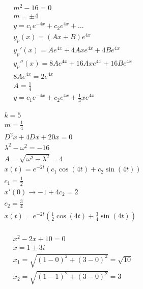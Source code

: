\documentclass[12pt]{article}
\begin{document}
\hline
\begin{equation}
  \begin{split}
    m^2-16=0\\
    m=\pm4\\
    y=c_1e^{-4x}+c_2e^{4x}+\dots\\
    y_p(x)=(Ax+B)e^{4x}\\
    y_p'(x)=Ae^{4x}+4Axe^{4x}+4Be^{4x}\\
    y_p''(x)=8Ae^{4x}+16Axe^{4x}+16Be^{4x}\\
    8Ae^{4x}=2e^{4x}\\
    A=\frac{1}{4}\\
    y=c_1e^{-4x}+c_2e^{4x}+\frac{1}{4}xe^{4x}
  \end{split}
  \label{5}
\end{equation}
\hline
\newpage

\hline

\begin{equation}
  \begin{split}
    k=5\\
    m=\frac{1}{4}\\
    D^2x+4Dx+20x=0\\
    \lambda^2-\omega^2=-16\\
    A=\sqrt{\omega^2-\lambda^2}=4\\
    x(t)=e^{-2t}\left(c_1\cos\left( 4t \right)+c_2\sin\left( 4t \right) \right)\\
    c_1=\frac{1}{2}\\
    x'(0)\longrightarrow -1+4c_2=2\\
    c_2=\frac{3}{4}\\
    x(t)=e^{-2t}\left(\frac{1}{2}\cos\left( 4t \right)+\frac{3}{4}\sin\left( 4t \right) \right)\\
  \end{split}
  \label{6}
\end{equation}
\hline


\begin{equation}
  \begin{split}
    x^2-2x+10=0\\
    x=1\pm 3i\\
    x_1=\sqrt{(1-0)^2+(3-0)^2}=\sqrt{10}\\
    x_2=\sqrt{(1-1)^2+(3-0)^2}=3\\
  \end{split}
  \label{7}
\end{equation}
\hline
\end{document}
